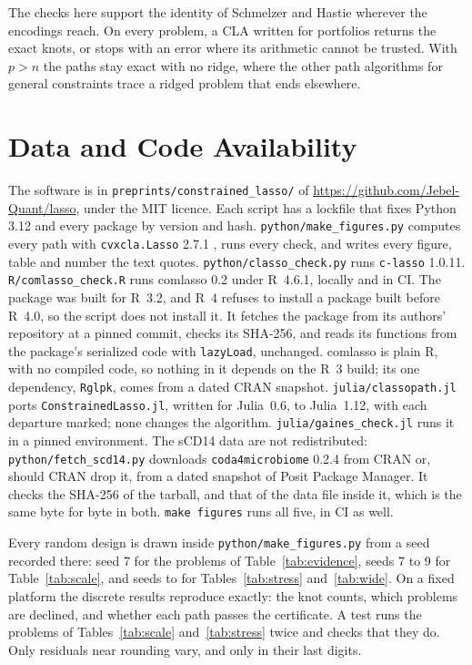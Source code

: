 \documentclass[11pt]{article}
\theoremstyle{remark}
\begin{document}
The checks here support the identity of Schmelzer and Hastie \cite{perspective}
wherever the encodings reach. On every problem, a CLA written for portfolios returns
the exact knots, or stops with an error where its arithmetic cannot be trusted. With
$p>n$ the paths stay exact with no ridge, where the other path algorithms for general
constraints trace a ridged problem that ends elsewhere.

\section*{Data and Code Availability}

The software is in \texttt{preprints/constrained\_lasso/} of
\url{https://github.com/Jebel-Quant/lasso}, under the MIT licence. Each script has a
lockfile that fixes Python 3.12 and every package by version and hash.
\texttt{python/make\_figures.py} computes every path with \texttt{cvxcla.Lasso} 2.7.1
\cite{cvxcla}, runs every check, and writes every figure, table and number the text
quotes. \texttt{python/classo\_check.py} runs \texttt{c-lasso} 1.0.11.
\texttt{R/comlasso\_check.R} runs comlasso 0.2 under R~4.6.1, locally and in CI. The
package was built for R~3.2, and R~4 refuses to install a package built before R~4.0,
so the script does not install it. It fetches the package from its authors' repository
at a pinned commit, checks its SHA-256, and reads its functions from the package's
serialized code with \texttt{lazyLoad}, unchanged. comlasso is plain R, with no
compiled code, so nothing in it depends on the R~3 build; its one dependency,
\texttt{Rglpk}, comes from a dated CRAN snapshot.
\texttt{julia/classopath.jl} ports \texttt{ConstrainedLasso.jl}, written for Julia~0.6,
to Julia~1.12, with each departure marked; none changes the algorithm.
\texttt{julia/gaines\_check.jl} runs it in a pinned environment. The sCD14 data are not
redistributed: \texttt{python/fetch\_scd14.py} downloads \texttt{coda4microbiome} 0.2.4
from CRAN or, should CRAN drop it, from a dated snapshot of Posit Package Manager. It
checks the SHA-256 of the tarball, and that of the data file inside it, which is the
same byte for byte in both. \texttt{make figures} runs all five, in CI as well.

Every random design is drawn inside \texttt{python/make\_figures.py} from a seed
recorded there: seed 7 for the problems of Table~\ref{tab:evidence}, seeds 7 to 9 for
Table~\ref{tab:scale}, and seeds \stSeedFirst{} to \stSeedLast{} for
Tables~\ref{tab:stress} and~\ref{tab:wide}. On a fixed platform the discrete results
reproduce exactly: the knot counts, which problems are declined, and whether each path
passes the certificate. A test runs the problems of Tables~\ref{tab:scale}
and~\ref{tab:stress} twice and checks that they do. Only residuals near rounding vary,
and only in their last digits.
\end{document}
